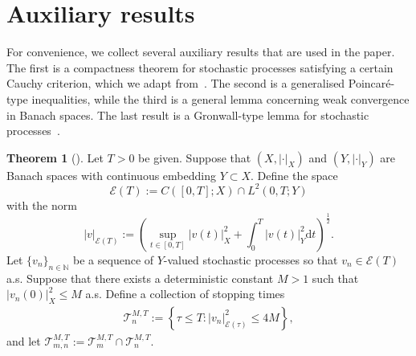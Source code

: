 \documentclass[11pt, reqno]{amsart}
\theoremstyle{definition}
\newtheorem{theorem}{Theorem}[section]
\numberwithin{equation}{section}
\newcommand{\bb}{\mathbb}
\newcommand{\dt}{\mathrm{d}t}
\newcommand{\abs}[1]{\left|{#1}\right|}
\begin{document}
\appendix

\section{Auxiliary results} \label{sec:app}

For convenience, we collect several auxiliary results that are used in the paper. The first is a compactness theorem for stochastic processes satisfying a certain Cauchy criterion, which we adapt from~\cite{GlaZia09, GlaTem11}. The second is a generalised Poincar\'e-type inequalities, while the third is a general lemma concerning weak convergence in Banach spaces. The last result is a Gronwall-type lemma for stochastic processes~\cite{GlaZia09}.

\begin{theorem}[\cite{GlaZia09, GlaTem11}]\label{the:compactness}
Let $T>0$ be given.
Suppose that $(X, \abs{\cdot}_X)$ and $(Y, \abs{\cdot}_Y)$ are Banach spaces with continuous embedding $Y\subset X$. Define the space
\[
\mathcal{E}(T):= C([0,T]; X) \cap L^2(0,T; Y)
\]
with the norm
\[
\abs{v}_{\mathcal{E}(T)}:= \left( \sup_{t\in [0,T]} \abs{v(t)}_X^2 + \int_0^T \abs{v(t)}_Y^2 \dt \right)^{\frac12}.
\]
Let $\{v_n\}_{n\in\bb{N}}$ be a sequence of $Y$-valued stochastic processes so that $v_n\in \mathcal{E}(T)$ a.s. Suppose that there exists a deterministic constant $M>1$ such that $\abs{v_n(0)}_X^2\leq M$ a.s. Define a collection of stopping times
\begin{align*}
	\mathcal{T}_{n}^{M,T}:= \left\{\tau\leq T: \abs{v_n}_{\mathcal{E}(\tau)}^2 \leq 4M \right\},
\end{align*}
and let $\mathcal{T}_{m,n}^{M,T}:= \mathcal{T}_m^{M,T} \cap \mathcal{T}_n^{M,T}$.


\end{theorem}
\end{document}
